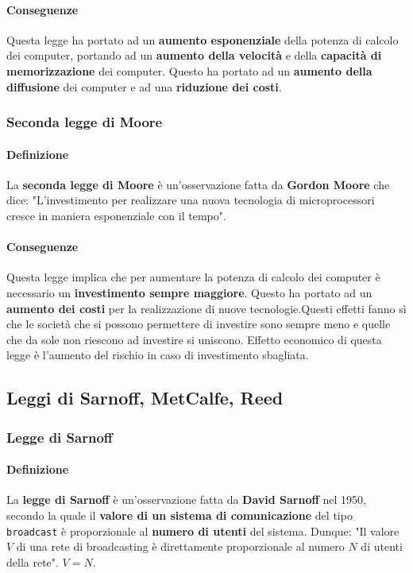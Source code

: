             \paragraph{Conseguenze} Questa legge ha portato ad un \textbf{aumento esponenziale} della potenza di calcolo dei computer, portando ad un \textbf{aumento della velocità} e della \textbf{capacità di memorizzazione} dei computer. Questo ha portato ad un \textbf{aumento della diffusione} dei computer e ad una \textbf{riduzione dei costi}.
        \subsubsection{Seconda legge di Moore}
            \paragraph{Definizione} La \textbf{seconda legge di Moore} è un'osservazione fatta da \textbf{Gordon Moore} che dice: "L'investimento per realizzare una nuova tecnologia di microprocessori cresce in maniera esponenziale con il tempo".
            \paragraph{Conseguenze} Questa legge implica che per aumentare la potenza di calcolo dei computer è necessario un \textbf{investimento sempre maggiore}. Questo ha portato ad un \textbf{aumento dei costi} per la realizzazione di nuove tecnologie.\newline Questi effetti fanno sì che le società che si possono permettere di investire sono sempre meno e quelle che da sole non riescono ad investire si uniscono. Effetto economico di questa legge è l'aumento del rischio in caso di investimento sbagliata. 
    \subsection{Leggi di Sarnoff, MetCalfe, Reed}
        \subsubsection{Legge di Sarnoff}
            \paragraph{Definizione} La \textbf{legge di Sarnoff} è un'osservazione fatta da \textbf{David Sarnoff} nel 1950, secondo la quale il \textbf{valore di un sistema di comunicazione} del tipo \texttt{broadcast} è proporzionale al \textbf{numero di utenti} del sistema. Dunque: "Il valore $V$ di una rete di broadcasting è direttamente proporzionale al numero $N$ di utenti della rete". $ V = N $.
